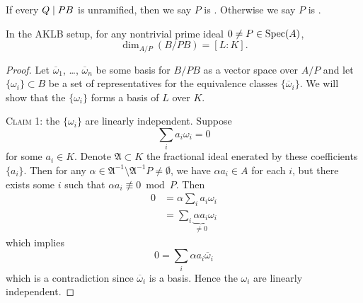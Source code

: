 \begin{definition}
If every $Q\mid PB$ is unramified, then we say $P$ is
. Otherwise we say $P$ is .
\end{definition}

\begin{lemma}\label{lemma:19.3}
In the AKLB setup, for any nontrivial prime ideal $0\neq
P\in\operatorname{Spec}(A)$,
\begin{equation*}
\dim_{A/P}(B/PB)=[L:K].
\end{equation*}
\end{lemma}

\begin{proof}
Let $\overline{\omega}_{1}$, \dots, $\overline{\omega}_{n}$ be some
basis for $B/PB$ as a vector space over $A/P$ and let
$\{\omega_{i}\}\subset B$ be a set of representatives for the
equivalence classes $\{\overline{\omega}_{i}\}$. We will show that the
$\{\omega_{i}\}$ forms a basis of $L$ over $K$.

\textsc{Claim 1}: the $\{\omega_{i}\}$ are linearly independent.
Suppose
\begin{equation}
\sum_{i}a_{i}\omega_{i}=0
\end{equation}
for some $a_{i}\in K$. Denote $\mathfrak{A}\subset K$ the fractional
ideal enerated by these coefficients $\{a_{i}\}$. Then for any
$\alpha\in\mathfrak{A}^{-1}\setminus\mathfrak{A}^{-1}P\neq\emptyset$,
we have $\alpha a_{i}\in A$ for each $i$, but there exists some $i$
such that $\alpha a_{i}\not\equiv0\bmod{P}$. Then
\begin{subequations}
  \begin{align}
0 &= \alpha\sum_{i}a_{i}\omega_{i}\\
&=\sum_{i}\underbrace{\alpha a_{i}}_{\neq0}\omega_{i}
  \end{align}
\end{subequations}
which implies
\begin{equation}
0 = \sum_{i}\alpha a_{i}\overline{\omega}_{i}
\end{equation}
which is a contradiction since $\overline{\omega}_{i}$ is a
basis. Hence the $\omega_{i}$ are linearly independent.


\end{proof}
